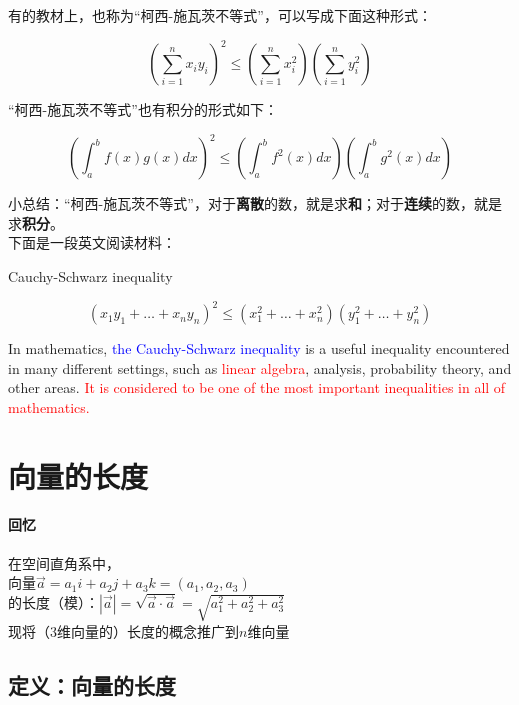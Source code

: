 \documentclass[UTF8]{ctexbook}
\begin{document}
有的教材上，也称为“柯西-施瓦茨不等式”，可以写成下面这种形式：

\begin{displaymath}
(\sum_{i=1}^{n}x_{i}y_{i})^{2} \leq (\sum_{i=1}^{n}x_{i}^{2})(\sum_{i=1}^{n}y_{i}^{2})
\end{displaymath}

“柯西-施瓦茨不等式”也有积分的形式如下：

\begin{displaymath}
\left (\int_{a}^{b} f(x) g(x) dx \right )^{2} \leq \left (\int_{a}^{b} f^{2}(x) dx \right ) \left (\int_{a}^{b} g^{2}(x) dx \right )
\end{displaymath}

小总结：“柯西-施瓦茨不等式”，对于\textbf{离散}的数，就是求\textbf{和}；对于\textbf{连续}的数，就是求\textbf{积分}。\\

下面是一段英文阅读材料：

Cauchy-Schwarz inequality

\begin{displaymath}
(x_{1}y_{1}+\dots+x_{n}y_{n})^{2} \leq
(x_{1}^{2}+\dots+x_{n}^{2})(y_{1}^{2}+\dots+y_{n}^{2})
\end{displaymath}

In mathematics, \textcolor{blue}{the Cauchy-Schwarz inequality} is a useful inequality encountered in many different settings, such as \textcolor{red}{linear algebra}, analysis, probability theory, and other areas. \textcolor{red}{It is considered to be one of the most important inequalities in all of mathematics.}


\section{向量的长度}

\paragraph{回忆} 在空间直角系中，\\
向量$\vec{a}=a_{1}i+a_{2}j+a_{3}k=(a_{1},a_{2},a_{3})$\\
的长度（模）：$|\vec{a}|=\sqrt{\vec{a} \cdot \vec{a}}=\sqrt{a_{1}^{2}+a_{2}^{2}+a_{3}^{2}}$\\

现将（3维向量的）长度的概念推广到$n$维向量

\subsection{定义：向量的长度}
\end{document}

